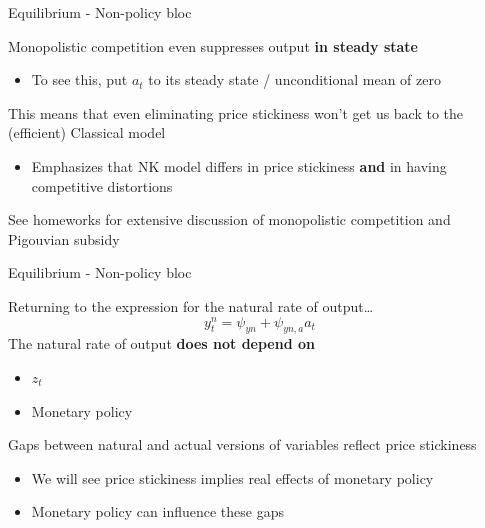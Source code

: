 \documentclass{beamer}
\begin{document}
\begin{frame}{Equilibrium - Non-policy bloc}

Monopolistic competition even suppresses output \textbf{in steady state}
\begin{itemize}
\item	To see this, put $a_{t}$ to its steady state / unconditional mean of zero
\end{itemize}

\vspace{3mm}
This means that even eliminating price stickiness won't get us back to the (efficient) Classical model
\begin{itemize}
\item	Emphasizes that NK model differs in price stickiness \textbf{and} in having competitive distortions
\end{itemize}

\vspace{3mm}
See homeworks for extensive discussion of monopolistic competition and Pigouvian subsidy

\end{frame}


	
\begin{frame}{Equilibrium - Non-policy bloc}

Returning to the expression for the natural rate of output\ldots
\[
y^{n}_{t} 	= 		\psi_{yn} + \psi_{yn,a} a_{t}
\]
The natural rate of output \textbf{does not depend on}
\begin{itemize}
\item $z_{t}$
\item Monetary policy
\end{itemize}

\vspace{3mm}
Gaps between natural and actual versions of variables reflect price stickiness
\begin{itemize}
\item	We will see price stickiness implies real effects of monetary policy
\item	Monetary policy can influence these gaps
\end{itemize}

\end{frame}

\end{document}

